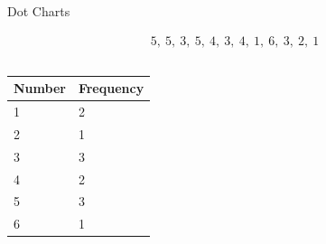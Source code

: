 \begin{frame}{Dot Charts}

  \begin{eqnarray*}
    5,~5,~3,~5,~4,~3,~4,~1,~6,~3,~2,~1
  \end{eqnarray*}


  \begin{columns}


    \begin{tabular}{l|l}
      Number  & Frequency \\ \hline
      1 & 2 \\
      2 & 1 \\
      3 & 3 \\
      4 & 2 \\
      5 & 3 \\
      6 & 1 
    \end{tabular}




  \end{columns}
  
  
\end{frame}


